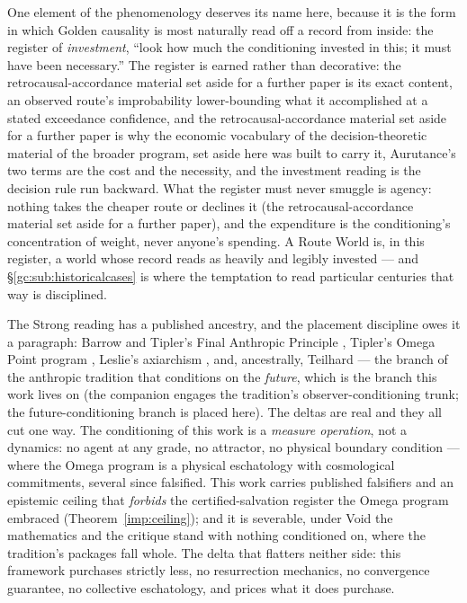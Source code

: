 \begin{remark}
\label{gc:rem:invested}
One element of the phenomenology deserves its name here, because it is
the form in which Golden causality is most naturally read off a record
from inside: the register of \emph{investment}, ``look how much the
conditioning invested in this; it must have been necessary.'' The
register is earned rather than decorative:
the retrocausal-accordance material set aside for a further paper is its exact content, an observed
route's improbability lower-bounding what it accomplished at a stated
exceedance confidence, and the retrocausal-accordance material set aside for a further paper is why the
economic vocabulary of the decision-theoretic material of the broader program, set aside here was built to carry it, Aurutance's two terms are the cost and the necessity, and the
investment reading is the decision rule run backward. What the register
must never smuggle is agency: nothing takes the cheaper route or
declines it (the retrocausal-accordance material set aside for a further paper), and the expenditure is the
conditioning's concentration of weight, never anyone's spending. A
Route World is, in this register, a world whose record reads as heavily
and legibly invested --- and \S\ref{gc:sub:historicalcases} is where
the temptation to read particular centuries that way is disciplined.
\end{remark}

\begin{remark}
\label{rw:rem:futurecond}
The Strong reading has a published ancestry, and the placement
discipline owes it a paragraph: Barrow and Tipler's Final Anthropic
Principle \cite{BarrowTipler86}, Tipler's Omega Point program
\cite{Tipler94}, Leslie's axiarchism \cite{Leslie79}, and,
ancestrally, Teilhard \cite{Teilhard55} --- the branch of the
anthropic tradition that conditions on the \emph{future}, which is
the branch this work lives on (the companion engages the tradition's
observer-conditioning trunk; the future-conditioning branch is placed
here). The deltas are real and they all cut one way. The conditioning
of this work is a \emph{measure operation}, not a dynamics: no agent
at any grade, no attractor, no physical boundary condition --- where
the Omega program is a physical eschatology with cosmological
commitments, several since falsified. This work carries published
falsifiers and an epistemic ceiling that \emph{forbids} the
certified-salvation register the Omega program embraced
(Theorem~\ref{imp:ceiling}); and it is severable, under Void the
mathematics and the critique stand with nothing conditioned on, where the tradition's packages fall whole. The delta that flatters
neither side: this framework purchases strictly less, no
resurrection mechanics, no convergence guarantee, no collective
eschatology, and prices what it does purchase.
\end{remark}

